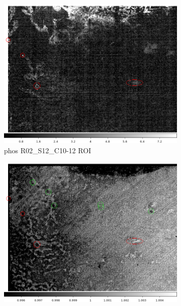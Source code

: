 \begin{figure}[!htbp]
\begin{subfigure}{0.30\textwidth}
     \label{subfig:comp:blue:R02_S12_C03}
\end{subfigure}
\newline
\begin{subfigure}{0.30\textwidth}
    \includegraphics[width=\textwidth]{figures/phosphorescence-survey/comp_phos_R02_S12_C10-2.png}
     \caption{phos  R02\_S12\_C10-12 ROI}
     \label{subfig:comp:phos:R02_S12_C10}
\end{subfigure}
\hfil
\begin{subfigure}{0.30\textwidth}
    \includegraphics[width=\textwidth]{figures/phosphorescence-survey/comp_blue_R02_S12_C10-2.png}

\end{subfigure}
\end{figure}
